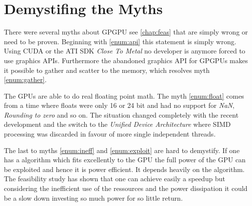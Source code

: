 \section{Demystifing the Myths} %
\label{sec:demystifing_the_myths}
There were several myths about \gls{GPGPU} see \ref{chap:feas} that are simply wrong or need to be proven. Beginning with \ref{enum:api} this statement is 
simply wrong. Using \gls{CUDA} or the ATI \gls{SDK} \emph{Close To Metal}
no developer is anymore forced to use graphics \glspl{API}. Furthermore the abandoned graphics \gls{API} for \glspl{GPGPU} makes it possible to gather and scatter to the memory, which resolves myth \ref{enum:gather}. 

The \glspl{GPU} are able to do real floating point math. The myth \ref{enum:float} comes from a time where floats were only 16 or 24 bit and had no support for \emph{NaN}, \emph{Rounding to zero} and so on. The situation changed completely with the recent development and the switch to the \emph{Unified Device Architecture} where \gls{SIMD} processing was discarded in 
favour of more single independent threads. 

The last to myths \ref{enum:ineff} and \ref{enum:exploit} are hard to demystify.
If one has a algorithm which fits excellently to the \gls{GPU} the full power of
the \gls{GPU} can be exploited and hence it is power efficient. It depends
heavily on the algorithm. The feasibility study has shown that one can achieve
easily a speedup but considering the inefficient use of the ressources and the
power dissipation it could be a slow down investing so much power for so little
return.








